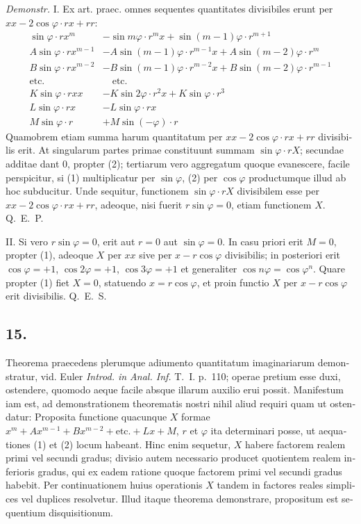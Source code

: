 \documentclass[12pt,a4paper]{article}
\begin{document}
\begin{otherlanguage}{latin}
\textit{Demonstr.} I. Ex art. praec. omnes sequentes quantitates divisibiles erunt per $xx-2\cos\varphi\cdot rx+rr$:
\begin{align*}
\sin\varphi\cdot r x^{m}&-\sin m\varphi\cdot r^{m}x+\sin(m-1)\varphi\cdot r^{m+1}\\
A\sin\varphi\cdot r x^{m-1}&-A\sin(m-1)\varphi\cdot r^{m-1}x+A\sin(m-2)\varphi\cdot r^{m}\\
B\sin\varphi\cdot r x^{m-2}&-B\sin(m-1)\varphi\cdot r^{m-2}x+B\sin(m-2)\varphi\cdot r^{m-1}\\
\text{etc.} &\quad \text{etc.}\\
K\sin\varphi\cdot rxx&-K\sin2\varphi\cdot r^{2}x+K\sin\varphi\cdot r^{3}\\
L\sin\varphi\cdot rx&-L\sin\varphi\cdot rx\\
M\sin\varphi\cdot r&+M\sin(-\varphi)\cdot r
\end{align*}
Quamobrem etiam summa harum quantitatum per $xx-2\cos\varphi\cdot rx+rr$ divisibilis erit. At singularum partes primae constituunt summam $\sin\varphi\cdot rX$; secundae additae dant $0$, propter (2); tertiarum vero aggregatum quoque evanescere, facile perspicitur, si (1) multiplicatur per $\sin\varphi$, (2) per $\cos\varphi$ productumque illud ab hoc subducitur. Unde sequitur, functionem $\sin\varphi\cdot rX$ divisibilem esse per $xx-2\cos\varphi\cdot rx+rr$, adeoque, nisi fuerit $r\sin\varphi=0$, etiam functionem $X$. Q.~E.~P.

II. Si vero $r\sin\varphi=0$, erit aut $r=0$ aut $\sin\varphi=0$. In casu priori erit $M=0$, propter (1), adeoque $X$ per $xx$ sive per $x-r\cos\varphi$ divisibilis; in posteriori erit $\cos\varphi=+1$, $\cos2\varphi=+1$, $\cos3\varphi=+1$ et generaliter $\cos n\varphi=\cos\varphi^{n}$. Quare propter (1) fiet $X=0$, statuendo $x=r\cos\varphi$, et proin functio $X$ per $x-r\cos\varphi$ erit divisibilis. Q.~E.~S.

\subsection*{15.}
Theorema praecedens plerumque adiumento quantitatum imaginariarum demonstratur, vid. Euler \textit{Introd. in Anal. Inf.} T.~I. p.~110; operae pretium esse duxi, ostendere, quomodo aeque facile absque illarum auxilio erui possit. Manifestum iam est, ad demonstrationem theorematis nostri nihil aliud requiri quam ut ostendatur: Proposita functione quacunque $X$ formae $x^{m}+Ax^{m-1}+Bx^{m-2}+\text{etc.}+Lx+M$, $r$ et $\varphi$ ita determinari posse, ut aequationes (1) et (2) locum habeant. Hinc enim sequetur, $X$ habere factorem realem primi vel secundi gradus; divisio autem necessario producet quotientem realem inferioris gradus, qui ex eadem ratione quoque factorem primi vel secundi gradus habebit. Per continuationem huius operationis $X$ tandem in factores reales simplices vel duplices resolvetur. Illud itaque theorema demonstrare, propositum est sequentium disquisitionum.


\end{otherlanguage}
\end{document}
